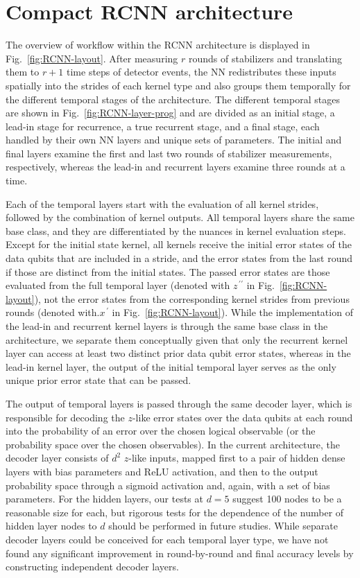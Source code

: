 \section{Compact RCNN architecture}
\label{sec:rcnn}

The overview of workflow within the RCNN architecture is displayed in Fig.~\ref{fig:RCNN-layout}. After measuring $r$ rounds of stabilizers and translating them to $r+1$ time steps of detector events, the NN redistributes these inputs spatially into the strides of each kernel type and also groups them temporally for the different temporal stages of the architecture. The different temporal stages are shown in Fig.~\ref{fig:RCNN-layer-prog} and are divided as an initial stage, a lead-in stage for recurrence, a true recurrent stage, and a final stage, each handled by their own NN layers and unique sets of parameters. The initial and final layers examine the first and last two rounds of stabilizer measurements, respectively, whereas the lead-in and recurrent layers examine three rounds at a time.

Each of the temporal layers start with the evaluation of all kernel strides, followed by the combination of kernel outputs. All temporal layers share the same base class, and they are differentiated by the nuances in kernel evaluation steps. Except for the initial state kernel, all kernels receive the initial error states of the data qubits that are included in a stride, and the error states from the last round if those are distinct from the initial states. The passed error states are those evaluated from the full temporal layer (denoted with $z^{\,\prime\prime}$ in Fig.~\ref{fig:RCNN-layout}), not the error states from the corresponding kernel strides from previous rounds (denoted with.$x^{\,\prime}$ in Fig.~\ref{fig:RCNN-layout}). While the implementation of the lead-in and recurrent kernel layers is through the same base class in the architecture, we separate them conceptually given that only the recurrent kernel layer can access at least two distinct prior data qubit error states, whereas in the lead-in kernel layer, the output of the initial temporal layer serves as the only unique prior error state that can be passed.

The output of temporal layers is passed through the same decoder layer, which is responsible for decoding the $z$-like error states over the data qubits at each round into the probability of an error over the chosen logical observable (or the probability space over the chosen observables). 
In the current architecture, the decoder layer consists of $d^2$ $z$-like inputs, mapped first to a pair of hidden dense layers with bias parameters and ReLU activation, and then to the output probability space through a sigmoid activation and, again, with a set of bias parameters. For the hidden layers, our tests at $d=5$ suggest 100 nodes to be a reasonable size for each, but rigorous tests for the dependence of the number of hidden layer nodes to $d$ should be performed in future studies. While separate decoder layers could be conceived for each temporal layer type, we have not found any significant improvement in round-by-round and final accuracy levels by constructing independent decoder layers.

